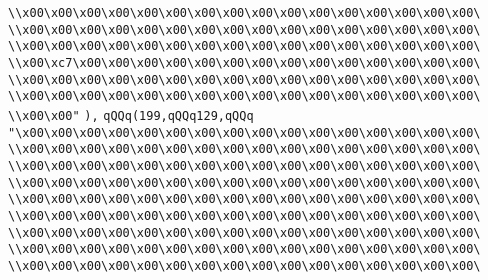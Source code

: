 \verb|\\x00\x00\x00\x00\x00\x00\x00\x00\x00\x00\x00\x00\x00\x00\x00\x00\|\newline
\verb|\\x00\x00\x00\x00\x00\x00\x00\x00\x00\x00\x00\x00\x00\x00\x00\x00\|\newline
\verb|\\x00\x00\x00\x00\x00\x00\x00\x00\x00\x00\x00\x00\x00\x00\x00\x00\|\newline
\verb|\\x00\xc7\x00\x00\x00\x00\x00\x00\x00\x00\x00\x00\x00\x00\x00\x00\|\newline
\verb|\\x00\x00\x00\x00\x00\x00\x00\x00\x00\x00\x00\x00\x00\x00\x00\x00\|\newline
\verb|\\x00\x00\x00\x00\x00\x00\x00\x00\x00\x00\x00\x00\x00\x00\x00\x00\|\newline
\verb|\\x00\x00"|\newline
\verb|),|\newline
\verb|qQQq(199,qQQq129,qQQq|\newline
\verb|"\x00\x00\x00\x00\x00\x00\x00\x00\x00\x00\x00\x00\x00\x00\x00\x00\|\newline
\verb|\\x00\x00\x00\x00\x00\x00\x00\x00\x00\x00\x00\x00\x00\x00\x00\x00\|\newline
\verb|\\x00\x00\x00\x00\x00\x00\x00\x00\x00\x00\x00\x00\x00\x00\x00\x00\|\newline
\verb|\\x00\x00\x00\x00\x00\x00\x00\x00\x00\x00\x00\x00\x00\x00\x00\x00\|\newline
\verb|\\x00\x00\x00\x00\x00\x00\x00\x00\x00\x00\x00\x00\x00\x00\x00\x00\|\newline
\verb|\\x00\x00\x00\x00\x00\x00\x00\x00\x00\x00\x00\x00\x00\x00\x00\x00\|\newline
\verb|\\x00\x00\x00\x00\x00\x00\x00\x00\x00\x00\x00\x00\x00\x00\x00\x00\|\newline
\verb|\\x00\x00\x00\x00\x00\x00\x00\x00\x00\x00\x00\x00\x00\x00\x00\x00\|\newline
\verb|\\x00\x00\x00\x00\x00\x00\x00\x00\x00\x00\x00\x00\x00\x00\x00\x00\|\newline
